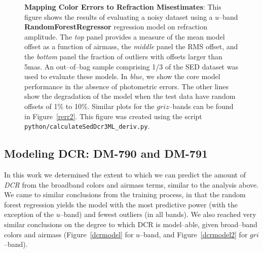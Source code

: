 \documentclass[DM,toc]{lsstdoc}
\begin{document}
\begin{figure}[!t]
    \centering
    \caption{{\bf Mapping Color Errors to Refraction Misestimates}:
      This figure shows the results of evaluating a noisy dataset
      using a $u$--band {\bf RandomForestRegressor} regression model
      on refraction amplitude.  The {\it top} panel provides a measure
      of the mean model offset as a function of airmass, the {\it
        middle} panel the RMS offset, and the {\it bottom} panel the
      fraction of outliers with offsets larger than 5mas.  An
      out--of--bag sample comprising 1/3 of the SED dataset was used
      to evaluate these models.  In {\it blue}, we show the core model
      performance in the absence of photometric errors.  The other
      lines show the degradation of the model when the test data have
      random offsets of 1\% to 10\%.  Similar plots for the
      $griz$--bands can be found in Figure~\ref{rerr2}.  This figure
      was created using the script {\tt
        python/calculateSedDcr3ML\_deriv.py}.}
    \label{rerr}
\end{figure}

\subsection{\bf Modeling DCR: DM-790 and DM-791}

In this work we determined the extent to which we can predict the
amount of {\it DCR} from the broadband colors and airmass terms,
similar to the analysis above.  We came to similar conclusions from
the training process, in that the random forest regression yields the
model with the most predictive power (with the exception of the
$u$--band) and fewest outliers (in all bands).  We also reached very
similar conclusions on the degree to which DCR is model--able, given
broad--band colors and airmass (Figure~\ref{dcrmodel} for $u$--band,
and Figure~\ref{dcrmodel2} for $gri$--band).
\end{document}
